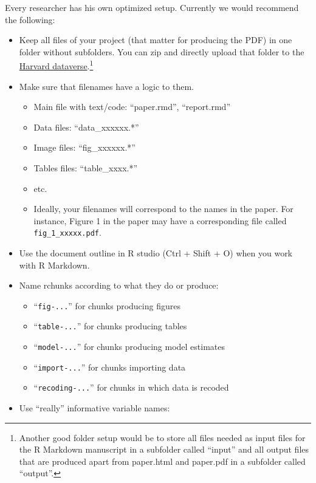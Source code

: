 \documentclass[
  letterpaper,
  DIV=11,
  numbers=noendperiod]{scrartcl}
\providecommand{\tightlist}{%
  \setlength{\itemsep}{0pt}\setlength{\parskip}{0pt}}\usepackage{longtable,booktabs,array}
\begin{document}
Every researcher has his own optimized setup. Currently we would
recommend the following:

\begin{itemize}
\tightlist
\item
  Keep all files of your project (that matter for producing the PDF) in
  one folder without subfolders. You can zip and directly upload that
  folder to the \href{https://dataverse.harvard.edu/}{Harvard
  dataverse}.\footnote{Another good folder setup would be to store all
    files needed as input files for the R Markdown manuscript in a
    subfolder called ``input'' and all output files that are produced
    apart from paper.html and paper.pdf in a subfolder called
    ``output''.}
\item
  Make sure that filenames have a logic to them.

  \begin{itemize}
  \tightlist
  \item
    Main file with text/code: ``paper.rmd'', ``report.rmd''
  \item
    Data files: ``data\_xxxxxx.*''
  \item
    Image files: ``fig\_xxxxxx.*''
  \item
    Tables files: ``table\_xxxx.*''
  \item
    etc.
  \item
    Ideally, your filenames will correspond to the names in the paper.
    For instance, Figure 1 in the paper may have a corresponding file
    called \texttt{fig\_1\_xxxxx.pdf}.
  \end{itemize}
\item
  Use the document outline in R studio (Ctrl + Shift + O) when you work
  with R Markdown.
\item
  Name rchunks according to what they do or produce:

  \begin{itemize}
  \tightlist
  \item
    ``\texttt{fig-...}'' for chunks producing figures
  \item
    ``\texttt{table-...}'' for chunks producing tables
  \item
    ``\texttt{model-...}'' for chunks producing model estimates
  \item
    ``\texttt{import-...}'' for chunks importing data
  \item
    ``\texttt{recoding-...}'' for chunks in which data is recoded
  \end{itemize}
\item
  Use ``really'' informative variable names:


\end{itemize}
\end{document}
